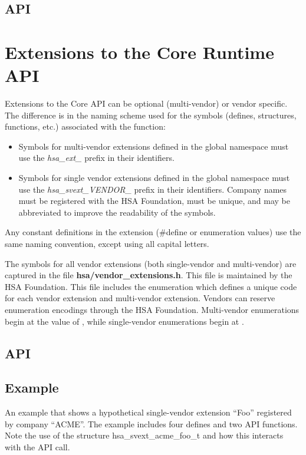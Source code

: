 \documentclass[final,oneside]{book}
\newcommand{\reftyp}[1]{#1}
\begin{document}
\subsection{API}



\section{Extensions to the Core Runtime API}\label{extensions}
Extensions to the Core API can be optional (multi-vendor) or vendor
specific. The difference is in the naming scheme used for the symbols (defines,
structures, functions, etc.) associated with the function:

\begin{itemize}
\item Symbols for multi-vendor extensions defined in the global namespace must
  use the \emph{hsa_ext_} prefix in their identifiers.
\item Symbols for single vendor extensions defined in the global namespace must
  use the \emph{hsa_svext_VENDOR_} prefix in their identifiers. Company names
  must be registered with the HSA Foundation, must be unique, and may be
  abbreviated to improve the readability of the symbols.
\end{itemize}

Any constant definitions in the extension (\#define or enumeration values) use
the same naming convention, except using all capital letters.

The symbols for all vendor extensions (both single-vendor and multi-vendor) are
captured in the file {\bf hsa/vendor_extensions.h}. This file is maintained by
the HSA Foundation. This file includes the enumeration 
which defines a unique code for each vendor extension and multi-vendor
extension. Vendors can reserve enumeration encodings through the HSA
Foundation. Multi-vendor enumerations begin at the value of
, while single-vendor enumerations begin at
.

\subsection{API}


\subsection{Example}
An example that shows a hypothetical single-vendor extension ``Foo'' registered
by company ``ACME''. The example includes four defines and two API functions.
Note the use of the structure \reftyp{hsa_svext_acme_foo_t} and how this
interacts with the  API call.
\end{document}
